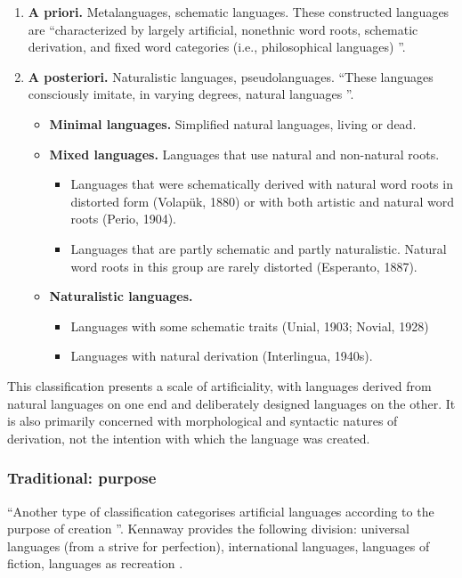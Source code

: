 \documentclass[14pt, a4paper]{extreport}
\begin{document}
\begin{enumerate}
  \item \textbf{A priori.} Metalanguages, schematic languages. These constructed languages are ``characterized by largely artificial, nonethnic word roots, schematic derivation, and fixed word categories (i.e., philosophical languages) \parencite[6]{janton}''.
  \item \textbf{A posteriori.} Naturalistic languages, pseudolanguages. ``These languages consciously imitate, in varying degrees, natural languages \parencite[5]{janton}''.
  \begin{itemize}
    \item \textbf{Minimal languages.} Simplified natural languages, living or dead.
    \item \textbf{Mixed languages.} Languages that use natural and non-natural roots.
      \begin{itemize}
        \item Languages that were schematically derived with natural word roots in distorted form (Volapük, 1880) or with both artistic and natural word roots (Perio, 1904).
        \item Languages that are partly schematic and partly naturalistic. Natural word roots in this group are rarely distorted (Esperanto, 1887).
      \end{itemize}
  \item \textbf{Naturalistic languages.}
    \begin{itemize}
      \item Languages with some schematic traits (Unial, 1903; Novial, 1928)
      \item Languages with natural derivation (Interlingua, 1940s).
    \end{itemize}
  \end{itemize}
\end{enumerate}

This classification presents a scale of artificiality, with languages derived from natural languages on one end and deliberately designed languages on the other. It is also primarily concerned with morphological and syntactic natures of derivation, not the intention with which the language was created.
      \subsubsection{Traditional: purpose}
``Another type of classification categorises artificial languages according to the purpose of creation \parencite[93]{stria}''. Kennaway provides the following division: universal languages (from a strive for perfection), international languages, languages of fiction, languages as recreation \parencite{kennaway}.
\end{document}
